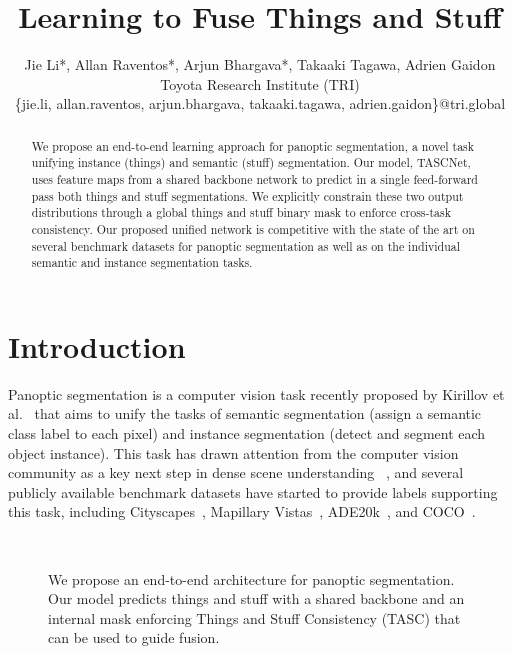 \documentclass[10pt,twocolumn]{article}
\title{Learning to Fuse Things and Stuff}
\author{Jie Li*, Allan Raventos*, Arjun Bhargava*, Takaaki Tagawa, Adrien Gaidon\\
Toyota Research Institute (TRI) \\
\{jie.li, allan.raventos, arjun.bhargava, takaaki.tagawa, adrien.gaidon\}@tri.global}
\begin{document}
\maketitle
\begin{abstract}
    We propose an end-to-end learning approach for panoptic segmentation, a novel task unifying instance (things) and semantic (stuff) segmentation. 
    Our model, TASCNet, uses feature maps from a shared backbone network to predict in a single feed-forward pass both things and stuff segmentations. We explicitly constrain these two output distributions through a global things and stuff binary mask to enforce cross-task consistency. Our proposed unified network is competitive with the state of the art on several benchmark datasets for panoptic segmentation as well as on the individual semantic and instance segmentation tasks.

\end{abstract}
\section{Introduction}\label{sec:intro}

Panoptic segmentation is a computer vision task recently proposed by Kirillov et al.~\cite{kirillov2018panoptic}
that aims to unify the tasks of semantic segmentation (assign a semantic class label to each pixel) and instance segmentation (detect and segment each object instance). This task has drawn attention from the computer vision community as a key next step in dense scene understanding ~\cite{kendall2017multi,Li_2018_ECCV,neven2017fast}, and several publicly available benchmark datasets have started to provide labels supporting this task, including Cityscapes~\cite{CordtsCVPR16Cityscapes}, Mapillary Vistas~\cite{neuhold2017mapillary-vistas}, ADE20k~\cite{zhou2017scene}, and COCO~\cite{LinECCV14Microsoft}.

\begin{figure}[ht!]
    \centering
    \\
    \caption{We propose an end-to-end architecture for panoptic segmentation. Our model predicts things and stuff with a shared backbone and an internal mask enforcing Things and Stuff Consistency (TASC) that can be used to guide fusion.}
    \vspace*{1mm}
    \label{fig:flowchart}
\end{figure}
\end{document}
